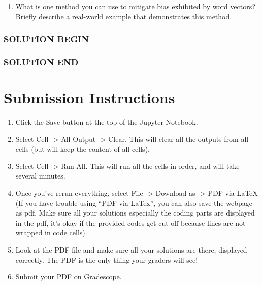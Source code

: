 \documentclass[11pt]{article}
\providecommand{\tightlist}{%
      \setlength{\itemsep}{0pt}\setlength{\parskip}{0pt}}
\begin{document}
\begin{enumerate}
    \def\labelenumi{\alph{enumi}.}
    \setcounter{enumi}{1}
    \tightlist
    \item
          What is one method you can use to mitigate bias exhibited by word
          vectors? Briefly describe a real-world example that demonstrates this
          method.
\end{enumerate}

\subsubsection{SOLUTION BEGIN}\label{solution-begin}

\subsubsection{SOLUTION END}\label{solution-end}

\section{\texorpdfstring{ Submission
      Instructions}{ Submission Instructions}}\label{submission-instructions}

\begin{enumerate}
    \def\labelenumi{\arabic{enumi}.}
    \tightlist
    \item
          Click the Save button at the top of the Jupyter Notebook.
    \item
          Select Cell -\textgreater{} All Output -\textgreater{} Clear. This
          will clear all the outputs from all cells (but will keep the content
          of all cells).
    \item
          Select Cell -\textgreater{} Run All. This will run all the cells in
          order, and will take several minutes.
    \item
          Once you've rerun everything, select File -\textgreater{} Download as
          -\textgreater{} PDF via LaTeX (If you have trouble using ``PDF via
          LaTex'', you can also save the webpage as pdf. Make sure all your
          solutions especially the coding parts are displayed in the pdf, it's
          okay if the provided codes get cut off because lines are not wrapped
          in code cells).
    \item
          Look at the PDF file and make sure all your solutions are there,
          displayed correctly. The PDF is the only thing your graders will see!
    \item
          Submit your PDF on Gradescope.
\end{enumerate}


\end{document}

